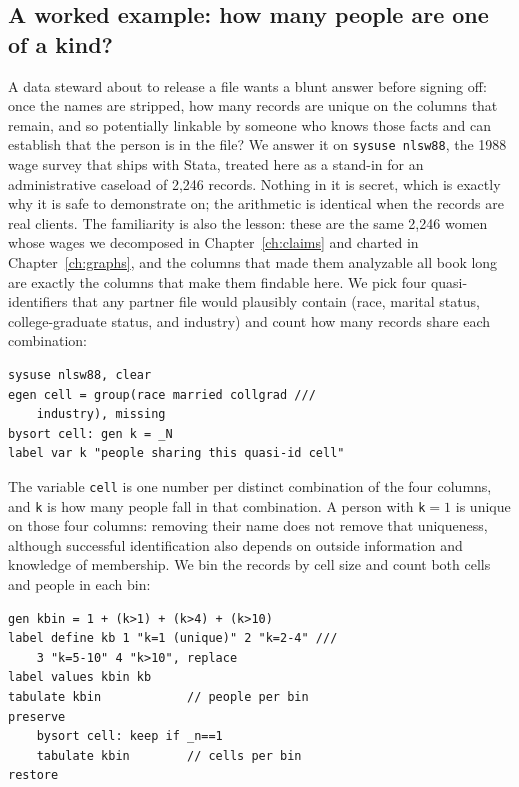 \subsection{A worked example: how many people are one of a kind?}\label{sec:kanon}
A data steward about to release a file wants a blunt answer before signing off: once the names are stripped, how many records are unique on the columns that remain, and so potentially linkable by someone who knows those facts and can establish that the person is in the file? We answer it on \texttt{sysuse nlsw88}, the 1988 wage survey that ships with Stata, treated here as a stand-in for an administrative caseload of 2{,}246 records. Nothing in it is secret, which is exactly why it is safe to demonstrate on; the arithmetic is identical when the records are real clients. The familiarity is also the lesson: these are the same 2{,}246 women whose wages we decomposed in Chapter~\ref{ch:claims} and charted in Chapter~\ref{ch:graphs}, and the columns that made them analyzable all book long are exactly the columns that make them findable here. We pick four quasi-identifiers that any partner file would plausibly contain (race, marital status, college-graduate status, and industry) and count how many records share each combination:
\par
{\footnotesize
\begin{verbatim}
sysuse nlsw88, clear
egen cell = group(race married collgrad ///
    industry), missing
bysort cell: gen k = _N
label var k "people sharing this quasi-id cell"
\end{verbatim}
}
The variable \texttt{cell} is one number per distinct combination of the four columns, and \texttt{k} is how many people fall in that combination. A person with \texttt{k}${}=1$ is unique on those four columns: removing their name does not remove that uniqueness, although successful identification also depends on outside information and knowledge of membership. We bin the records by cell size and count both cells and people in each bin:
\par
{\footnotesize
\begin{verbatim}
gen kbin = 1 + (k>1) + (k>4) + (k>10)
label define kb 1 "k=1 (unique)" 2 "k=2-4" ///
    3 "k=5-10" 4 "k>10", replace
label values kbin kb
tabulate kbin            // people per bin
preserve
    bysort cell: keep if _n==1
    tabulate kbin        // cells per bin
restore
\end{verbatim}
}
